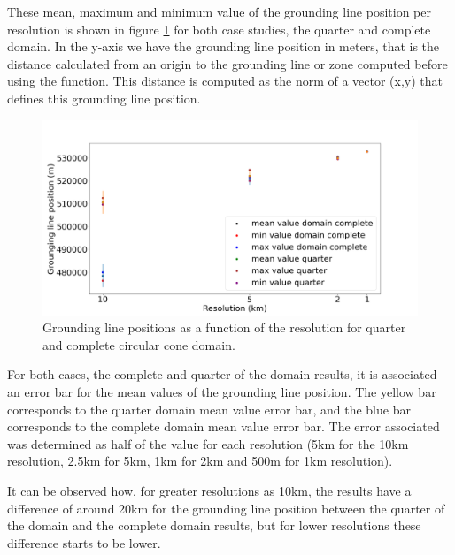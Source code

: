 \documentclass{article}
\begin{document}
These mean, maximum and minimum value of the grounding line position per resolution is shown in figure \ref{Grounding_lines__CONE_comparison} for both case studies, the quarter and complete domain. In the y-axis we have the grounding line position in meters, that is the distance calculated from an origin to the grounding line or zone computed before using the function. This distance is computed as the norm of a vector (x,y) that defines this grounding line position. 

\begin{figure}[!h]
	\centering
	\includegraphics[width=0.8\linewidth]{../fig/Figure_CONE_GL_positions.png}
	\caption{Grounding line positions as a function of the resolution for quarter and complete circular cone domain.}
	\label{Grounding_lines__CONE_comparison}
\end{figure}

For both cases, the complete and quarter of the domain results, it is associated an error bar for the mean values of the grounding line position. The yellow bar corresponds to the quarter domain mean value error bar, and the blue bar corresponds to the complete domain mean value error bar. The error associated was determined as half of the value for each resolution (5km for the 10km resolution, 2.5km for 5km, 1km for 2km and 500m for 1km resolution).

It can be observed how, for greater resolutions as 10km, the results have a difference of around 20km for the grounding line position between the quarter of the domain and the complete domain results, but for lower resolutions these difference starts to be lower. 
\end{document}
